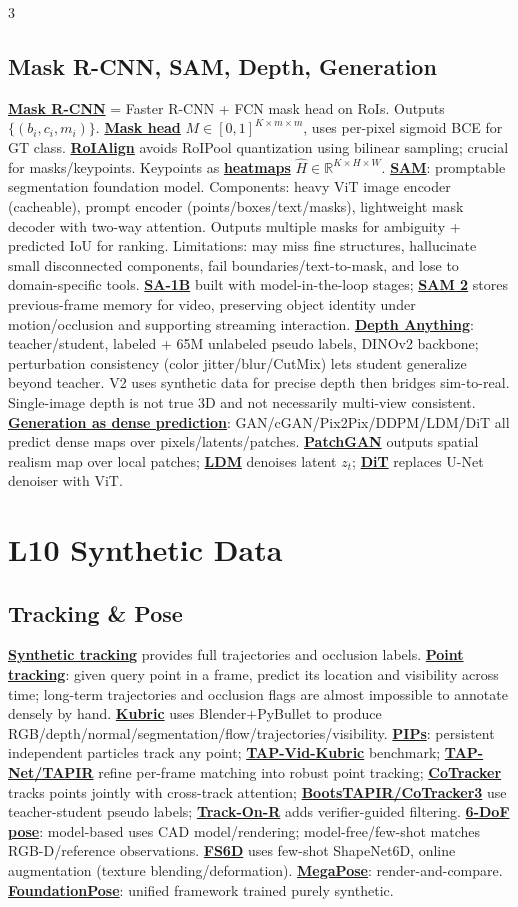 \documentclass{article}
\numberwithin{equation}{subsection}
\newcommand{\lowterm}[1]{\textbf{\underline{#1}}}
\newcommand{\R}{\mathbb{R}}
\begin{document}
\begin{multicols*}{3}
\subsection{Mask R-CNN, SAM, Depth, Generation}
\lowterm{Mask R-CNN} = Faster R-CNN + FCN mask head on RoIs. Outputs $\{(b_i,c_i,m_i)\}$. \lowterm{Mask head} $M\in[0,1]^{K\times m\times m}$, uses per-pixel sigmoid BCE for GT class. \lowterm{RoIAlign} avoids RoIPool quantization using bilinear sampling; crucial for masks/keypoints. Keypoints as \lowterm{heatmaps} $\hat H\in\R^{K\times H\times W}$.
\lowterm{SAM}: promptable segmentation foundation model. Components: heavy ViT image encoder (cacheable), prompt encoder (points/boxes/text/masks), lightweight mask decoder with two-way attention. Outputs multiple masks for ambiguity + predicted IoU for ranking. Limitations: may miss fine structures, hallucinate small disconnected components, fail boundaries/text-to-mask, and lose to domain-specific tools. \lowterm{SA-1B} built with model-in-the-loop stages; \lowterm{SAM 2} stores previous-frame memory for video, preserving object identity under motion/occlusion and supporting streaming interaction.
\lowterm{Depth Anything}: teacher/student, labeled + 65M unlabeled pseudo labels, DINOv2 backbone; perturbation consistency (color jitter/blur/CutMix) lets student generalize beyond teacher. V2 uses synthetic data for precise depth then bridges sim-to-real. Single-image depth is not true 3D and not necessarily multi-view consistent.
\lowterm{Generation as dense prediction}: GAN/cGAN/Pix2Pix/DDPM/LDM/DiT all predict dense maps over pixels/latents/patches. \lowterm{PatchGAN} outputs spatial realism map over local patches; \lowterm{LDM} denoises latent $z_t$; \lowterm{DiT} replaces U-Net denoiser with ViT.

\section{L10 Synthetic Data}
\subsection{Tracking \& Pose}
\lowterm{Synthetic tracking} provides full trajectories and occlusion labels. \lowterm{Point tracking}: given query point in a frame, predict its location and visibility across time; long-term trajectories and occlusion flags are almost impossible to annotate densely by hand. \lowterm{Kubric} uses Blender+PyBullet to produce RGB/depth/normal/segmentation/flow/trajectories/visibility. \lowterm{PIPs}: persistent independent particles track any point; \lowterm{TAP-Vid-Kubric} benchmark; \lowterm{TAP-Net/TAPIR} refine per-frame matching into robust point tracking; \lowterm{CoTracker} tracks points jointly with cross-track attention; \lowterm{BootsTAPIR/CoTracker3} use teacher-student pseudo labels; \lowterm{Track-On-R} adds verifier-guided filtering.
\lowterm{6-DoF pose}: model-based uses CAD model/rendering; model-free/few-shot matches RGB-D/reference observations. \lowterm{FS6D} uses few-shot ShapeNet6D, online augmentation (texture blending/deformation). \lowterm{MegaPose}: render-and-compare. \lowterm{FoundationPose}: unified framework trained purely synthetic. 


\end{multicols*}
\end{document}

